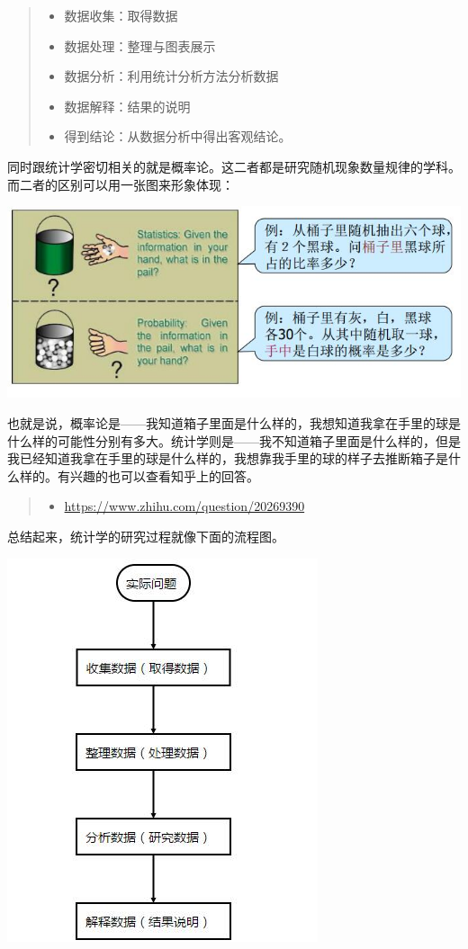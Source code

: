 \documentclass[]{ctexbook}
\providecommand{\tightlist}{%
  \setlength{\itemsep}{0pt}\setlength{\parskip}{0pt}}
\begin{document}
\begin{quote}
\begin{itemize}
\tightlist
\item
  数据收集：取得数据
\item
  数据处理：整理与图表展示
\item
  数据分析：利用统计分析方法分析数据
\item
  数据解释：结果的说明
\item
  得到结论：从数据分析中得出客观结论。
\end{itemize}
\end{quote}

同时跟统计学密切相关的就是概率论。这二者都是研究随机现象数量规律的学科。而二者的区别可以用一张图来形象体现：

\includegraphics[width=0.6\linewidth,height=0.3\textheight]{fig/fig1}

也就是说，概率论是------我知道箱子里面是什么样的，我想知道我拿在手里的球是什么样的可能性分别有多大。统计学则是------我不知道箱子里面是什么样的，但是我已经知道我拿在手里的球是什么样的，我想靠我手里的球的样子去推断箱子是什么样的。有兴趣的也可以查看知乎上的回答。

\begin{quote}
\begin{itemize}
\tightlist
\item
  \url{https://www.zhihu.com/question/20269390}
\end{itemize}
\end{quote}

总结起来，统计学的研究过程就像下面的流程图。

\includegraphics[width=0.8\linewidth,height=0.6\textheight]{fig/fig2}
\end{document}
